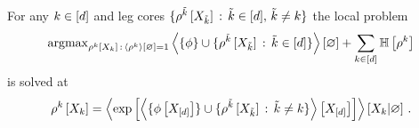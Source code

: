 \begin{theorem}
    For any $k\in[d]$ and leg cores $\{\rho^{\tilde{k}}\left[X_{\tilde{k}}\right] \,:\, \tilde{k}\in[d],\,\tilde{k}\neq k\}$ the local problem
    \begin{align*}
        \mathrm{argmax}_{\rho^{k}\left[X_{k}\right] \,:\, \left\langle \rho^{k}\right\rangle \left[ \varnothing \right]=1} \left\langle \{\phi\} \cup \{\rho^{\tilde{k}}\left[X_{\tilde{k}}\right]\,:\, \tilde{k}\in[d]\}\right\rangle \left[ \varnothing \right]
        + \sum_{k\in[d]} \mathbb{H}\left[\rho^{k}\right]
    \end{align*}
    is solved at
    \begin{align*}
        \rho^{k}\left[X_{k}\right]
        = \left\langle  \mathrm{exp}\left[ \left\langle  \{\phi\left[X_{[d]}\right] \}\cup
        \{\rho^{\tilde{k}}\left[X_{\tilde{k}}\right]\,:\, \tilde{k}\neq k\} \right\rangle \left[ X_{[d]} \right] \right]
        \right\rangle \left[ X_{k} | \varnothing \right] \, .
    \end{align*}
\end{theorem}
